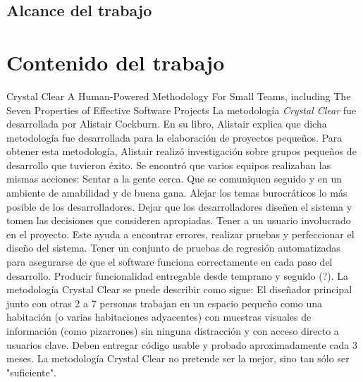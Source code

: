 \documentclass[12pt,a4paper]{article}
\begin{document}
\subsection{Alcance del trabajo}
\pagebreak
\section{Contenido del trabajo}
Crystal Clear
A Human-Powered Methodology For Small Teams,
including
The Seven Properties of Effective Software Projects
\linebreak
La metodolog\'ia \textit{Crystal Clear} fue desarrollada por Alistair Cockburn.
En su libro, Alistair explica que dicha metodolog\'ia fue desarrollada para la elaboraci\'on de proyectos peque\~nos.
Para obtener esta metodolog\'ia, Alistair realiz\'o investigaci\'on sobre grupos peque\~nos de desarrollo que tuvieron \'exito. Se encontr\'o que varios equipos realizaban las mismas acciones:
Sentar a la gente cerca. Que se comuniquen seguido y en un ambiente de amabilidad y de buena gana.
Alejar los temas burocr\'aticos lo m\'as posible de los desarrolladores. Dejar que los desarrolladores dise\~nen el sistema y tomen las decisiones que consideren apropiadas.
Tener a un usuario involucrado en el proyecto. Este ayuda a encontrar errores, realizar pruebas y perfeccionar el dise\~no del sistema.
Tener un conjunto de pruebas de regresi\'on automatizadas para asegurarse de que el software funciona correctamente en cada paso del desarrollo.
Producir funcionalidad entregable desde temprano y seguido (?).
La metodolog\'ia Crystal Clear se puede describir como sigue:
El dise\~nador principal junto con otras 2 a 7 personas trabajan en un espacio peque\~no como una habitaci\'on (o varias habitaciones adyacentes) con muestras visuales de informaci\'on (como pizarrones) sin ninguna distracci\'on y con acceso directo a usuarios clave.
Deben entregar c\'odigo usable y probado aproximadamente cada 3 meses.
La metodolog\'ia Crystal Clear no pretende ser la mejor, sino tan s\'olo ser "suficiente".
\end{document}
